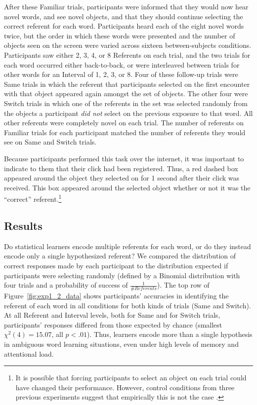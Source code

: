 \documentclass[man,floatsintext]{apa6}
\begin{document}
After these Familiar trials, participants were informed that they would now hear novel words, and see novel objects, and that they should continue selecting the correct referent for each word. Participants heard each of the eight novel words twice, but the order in which these words were presented and the number of objects seen on the screen were varied across sixteen between-subjects conditions. Participants saw either 2, 3, 4, or 8 Referents on each trial, and the two trials for each word occurred either back-to-back, or were interleaved between trials for other words for an Interval of 1, 2, 3, or 8. Four of these follow-up trials were Same trials in which the referent that participants selected on the first encounter with that object appeared again amongst the set of objects. The other four were Switch trials in which one of the referents in the set was selected randomly from the objects a participant \emph{did not} select on the previous exposure to that word. All other referents were completely novel on each trial. The number of referents on Familiar trials for each participant matched the number of referents they would see on Same and Switch trials.

Because participants performed this task over the internet, it was important to indicate to them that their click had been registered. Thus, a red dashed box appeared around the object they selected on for 1 second after their click was received. This box appeared around the selected object whether or not it was the ``correct'' referent.\footnote{It is possible that forcing participants to select an object on each trial could have changed their performance. However, control conditions from three previous experiments suggest that empirically this is not the case \cite{Medina2011, Smith2011a, Trueswell2013}.}

\subsection{Results}

Do statistical learners encode multiple referents for each word, or do they instead encode only a single hypothesized referent? We compared the distribution of correct responses made by each participant to the distribution expected if participants were selecting randomly (defined by a Binomial distribution with four trials and a probability of success of  $\frac{1}{\#Referents}$). The top row of Figure~\ref{fig:exp1_2_data} shows participants' accuracies in identifying the referent of each word in all conditions for both kinds of trials (Same and Switch). At all Referent and Interval levels, both for Same and for Switch trials, participants' responses differed from those expected by chance (smallest $\chi^{2}(4) = 15.07$, all $p < .01$). Thus, learners encode more than a single hypothesis in ambiguous word learning situations, even under high levels of memory and attentional load. 
\end{document}
